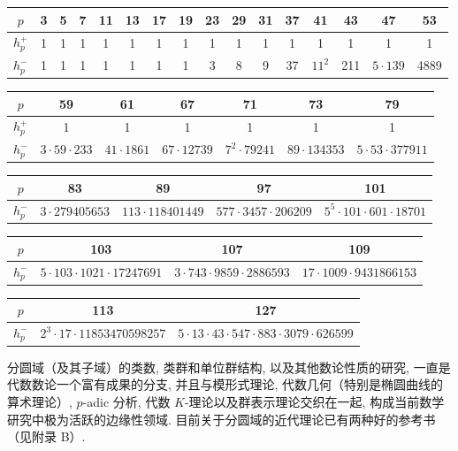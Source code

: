 \begin{remark}
\begin{center}
\begin{tabular}{|c|ccccccccccccccc|}
\hline
$p$ & 3 & 5 & 7 & 11 & 13 & 17 & 19 & 23 & 29 & 31 & 37 & 41 & 43 & 47 & 53 \\
\hline
$h_p^+$ & 1 & 1 & 1 & 1 & 1 & 1 & 1 & 1 & 1 & 1 & 1 & 1 & 1 & 1 & 1 \\
\hline
$h_p^-$ & 1 & 1 & 1 & 1 & 1 & 1 & 1 & 3 & 8 & 9 & 37 & $11^2$ & 211 & $5\cdot139$ & 4889 \\
\hline
\end{tabular}
\end{center}

\begin{center}
\begin{tabular}{|c|cccccc|}
\hline
$p$ & 59 & 61 & 67 & 71 & 73 & 79 \\
\hline
$h_p^+$ & 1 & 1 & 1 & 1 & 1 & 1 \\
\hline
$h_p^-$ & $3\cdot59\cdot233$ & $41\cdot1861$ & $67\cdot12739$ & $7^2\cdot79241$ & $89\cdot134353$ & $5\cdot53\cdot377911$ \\
\hline
\end{tabular}
\end{center}

\begin{center}
\begin{tabular}{|c|cccc|}
\hline
$p$ & 83 & 89 & 97 & 101 \\
\hline
$h_p^-$ & $3\cdot279405653$ & $113\cdot118401449$ & $577\cdot3457\cdot206209$ & $5^5\cdot101\cdot601\cdot18701$ \\
\hline
\end{tabular}
\end{center}

\begin{center}
\begin{tabular}{|c|ccc|}
\hline
$p$ & 103 & 107 & 109 \\
\hline
$h_p^-$ & $5\cdot103\cdot1021\cdot17247691$ & $3\cdot743\cdot9859\cdot2886593$ & $17\cdot1009\cdot9431866153$ \\
\hline
\end{tabular}
\end{center}

\begin{center}
\begin{tabular}{|c|cc|}
\hline
$p$ & 113 & 127 \\
\hline
$h_p^-$ & $2^3\cdot17\cdot11853470598257$ & $5\cdot13\cdot43\cdot547\cdot883\cdot3079\cdot626599$ \\
\hline
\end{tabular}
\end{center}

分圆域（及其子域）的类数, 类群和单位群结构, 以及其他数论性质的研究, 一直是代数数论一个富有成果的分支, 并且与模形式理论, 代数几何（特别是椭圆曲线的算术理论）, $p$-adic 分析, 代数 $K$-理论以及群表示理论交织在一起, 构成当前数学研究中极为活跃的边缘性领域. 目前关于分圆域的近代理论已有两种好的参考书（见附录 B）.
\end{remark}

